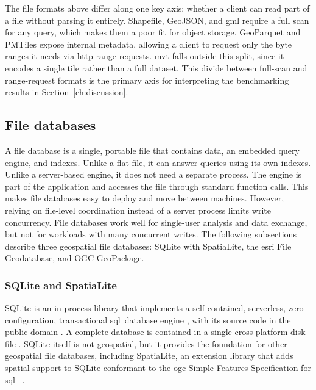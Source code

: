 The file formats above differ along one key axis: whether a client can read part of a file without parsing it entirely. Shapefile, GeoJSON, and \acrshort{gml} require a full scan for any query, which makes them a poor fit for object storage. GeoParquet and PMTiles expose internal metadata, allowing a client to request only the byte ranges it needs via \acrshort{http} range requests. \acrshort{mvt} falls outside this split, since it encodes a single tile rather than a full dataset. This divide between full-scan and range-request formats is the primary axis for interpreting the benchmarking results in Section~\ref{ch:discussion}.

\subsection{File databases}
\label{sec:file-databases}
A file database is a single, portable file that contains data, an embedded query engine, and indexes. Unlike a flat file, it can answer queries using its own indexes. Unlike a server-based engine, it does not need a separate process. The engine is part of the application and accesses the file through standard function calls. This makes file databases easy to deploy and move between machines. However, relying on file-level coordination instead of a server process limits write concurrency. File databases work well for single-user analysis and data exchange, but not for workloads with many concurrent writes. The following subsections describe three geospatial file databases: SQLite with SpatiaLite, the \acrshort{esri} File Geodatabase, and OGC GeoPackage.

\subsubsection{SQLite and SpatiaLite}
\label{sec:sqlite-spatialite}
SQLite is an in-process library that implements a self-contained, serverless, zero-configuration, transactional \acrfull{sql} database engine \parencite{sqlite2024_about}, with its source code in the public domain \parencite{sqlite2024_copyright}. A complete database is contained in a single cross-platform disk file \parencite{sqlite2024_about}. SQLite itself is not geospatial, but it provides the foundation for other geospatial file databases, including SpatiaLite, an extension library that adds spatial support to SQLite conformant to the \acrshort{ogc} Simple Features Specification for \acrshort{sql}  \parencite{gaia2011_spatialite_manual}.

